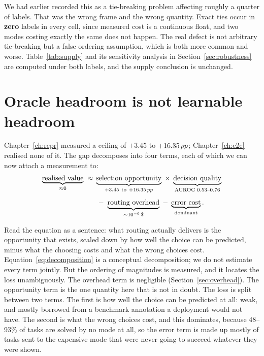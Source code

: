 We had earlier recorded this as a tie-breaking problem affecting roughly a
quarter of labels. That was the wrong frame and the wrong quantity. Exact ties
occur in \textbf{zero} labels in every cell, since measured cost is a continuous float, and two modes costing exactly the same does not happen. The real defect
is not arbitrary tie-breaking but a false ordering assumption, which is both
more common and worse. Table~\ref{tab:supply} and its sensitivity analysis in
Section~\ref{sec:robustness} are computed under both labels, and the
supply conclusion is unchanged.

\section{Oracle headroom is not learnable headroom}
\label{sec:headroom-gap}

Chapter~\ref{ch:repr} measured a ceiling of $+3.45$ to $+16.35\,pp$;
Chapter~\ref{ch:e2e} realised none of it. The gap decomposes into four terms,
each of which we can now attach a measurement to:
\begin{equation}
\begin{split}
  \underbrace{\text{realised value}}_{\approx 0}
  \;\approx\;
  &\underbrace{\text{selection opportunity}}_{+3.45\ \text{to}\ +16.35\pp}
  \;\times\;
  \underbrace{\text{decision quality}}_{\text{AUROC } 0.53\text{--}0.76} \\[4pt]
  &\;-\;
  \underbrace{\text{routing overhead}}_{\sim10^{-6}\,\$}
  \;-\;
  \underbrace{\text{error cost}}_{\text{dominant}} .
\end{split}
  \label{eq:decomposition}
\end{equation}

Read the equation as a sentence: what routing actually delivers is the
opportunity that exists, scaled down by how well the choice can be predicted,
minus what the choosing costs and what the wrong choices cost.
Equation~\ref{eq:decomposition} is a conceptual decomposition; we do not
estimate every term jointly. But the ordering of magnitudes is measured, and it
locates the loss unambiguously. The overhead term is negligible
(Section~\ref{sec:overhead}). The opportunity term is the one quantity here that is not in doubt. The
loss is split between two terms. The first is how well the choice can be
predicted at all: weak, and mostly borrowed from a benchmark annotation a
deployment would not have. The second is what the wrong choices cost, and this
dominates, because 48--93\% of tasks are solved by no mode at all, so the
error term is made up mostly of tasks sent to the expensive mode that were
never going to succeed whatever they were shown.

